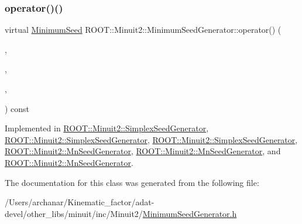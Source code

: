 \mbox{\label{classROOT_1_1Minuit2_1_1MinimumSeedGenerator_a670b9671c73d7e0d3caa148e82d4b2fa}} 
\subsubsection{\texorpdfstring{operator()()}{operator()()}\hspace{0.1cm}{\footnotesize\ttfamily [6/6]}}
{\footnotesize\ttfamily virtual \mbox{\hyperlink{classROOT_1_1Minuit2_1_1MinimumSeed}{Minimum\+Seed}} R\+O\+O\+T\+::\+Minuit2\+::\+Minimum\+Seed\+Generator\+::operator() (\begin{DoxyParamCaption}\item[{const \mbox{\hyperlink{classROOT_1_1Minuit2_1_1MnFcn}{Mn\+Fcn}} \&}]{,  }\item[{const \mbox{\hyperlink{classROOT_1_1Minuit2_1_1AnalyticalGradientCalculator}{Analytical\+Gradient\+Calculator}} \&}]{,  }\item[{const \mbox{\hyperlink{classROOT_1_1Minuit2_1_1MnUserParameterState}{Mn\+User\+Parameter\+State}} \&}]{,  }\item[{const \mbox{\hyperlink{classROOT_1_1Minuit2_1_1MnStrategy}{Mn\+Strategy}} \&}]{ }\end{DoxyParamCaption}) const\hspace{0.3cm}{\ttfamily [pure virtual]}}



Implemented in \mbox{\hyperlink{classROOT_1_1Minuit2_1_1SimplexSeedGenerator_abce591c5a1e1aa0882dd5b474530efce}{R\+O\+O\+T\+::\+Minuit2\+::\+Simplex\+Seed\+Generator}}, \mbox{\hyperlink{classROOT_1_1Minuit2_1_1SimplexSeedGenerator_a483dc9272be849a23bcd0d29ac4e3b94}{R\+O\+O\+T\+::\+Minuit2\+::\+Simplex\+Seed\+Generator}}, \mbox{\hyperlink{classROOT_1_1Minuit2_1_1SimplexSeedGenerator_a483dc9272be849a23bcd0d29ac4e3b94}{R\+O\+O\+T\+::\+Minuit2\+::\+Simplex\+Seed\+Generator}}, \mbox{\hyperlink{classROOT_1_1Minuit2_1_1MnSeedGenerator_a300ecb8a37b30fc5bd13c353f3338a92}{R\+O\+O\+T\+::\+Minuit2\+::\+Mn\+Seed\+Generator}}, \mbox{\hyperlink{classROOT_1_1Minuit2_1_1MnSeedGenerator_aeba9e3b985e5d74e797cafaffec74de3}{R\+O\+O\+T\+::\+Minuit2\+::\+Mn\+Seed\+Generator}}, and \mbox{\hyperlink{classROOT_1_1Minuit2_1_1MnSeedGenerator_aeba9e3b985e5d74e797cafaffec74de3}{R\+O\+O\+T\+::\+Minuit2\+::\+Mn\+Seed\+Generator}}.



The documentation for this class was generated from the following file\+:\begin{DoxyCompactItemize}
\item 
/\+Users/archanar/\+Kinematic\+\_\+factor/adat-\/devel/other\+\_\+libs/minuit/inc/\+Minuit2/\mbox{\hyperlink{adat-devel_2other__libs_2minuit_2inc_2Minuit2_2MinimumSeedGenerator_8h}{Minimum\+Seed\+Generator.\+h}}\end{DoxyCompactItemize}
